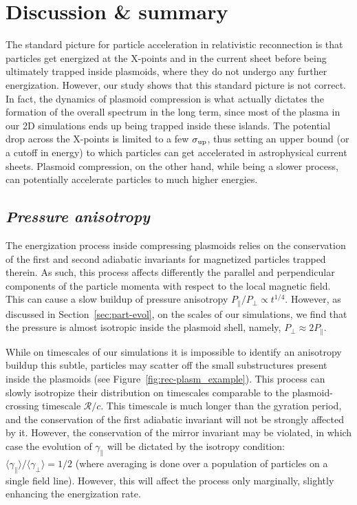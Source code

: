 %
% 
%
% 

\section{Discussion \& summary}
\label{sec:reconnection-discussion}

The standard picture for particle acceleration in relativistic reconnection is that particles get energized at the X-points and in the current sheet before being ultimately trapped inside  plasmoids, where they do not undergo any further energization. However, our study shows that this standard picture is not correct. In fact,  the dynamics of plasmoid compression is what actually dictates the formation of the overall spectrum in the long term, since most of the plasma in our 2D simulations ends up being trapped inside these islands. The potential drop across the X-points is limited to a few $\sigma_{\rm up}$, thus setting an upper bound (or a cutoff in energy) to which particles can get accelerated in astrophysical current sheets. Plasmoid compression, on the other hand, while being a slower process, can potentially accelerate particles to much higher energies.

\subsection*{\small\it Pressure anisotropy}
\label{sec:reconnection-anisotropy}
The energization process inside compressing plasmoids relies on the conservation of the first and second adiabatic invariants for magnetized particles trapped therein. As such, this process affects differently the parallel and perpendicular components of the particle momenta with respect to the local magnetic field. This can cause a slow buildup of pressure anisotropy $P_{\parallel}/P_{\perp} \propto t^{1/4}$. However, as discussed in Section~\ref{sec:part-evol}, on the scales of our simulations, we find that the pressure is almost isotropic inside the plasmoid shell, namely, $P_{\perp}\approx 2P_{\parallel}$. 

While on timescales of our simulations it is impossible to identify an anisotropy buildup this subtle, particles may scatter off the small substructures present inside the plasmoids (see Figure~\ref{fig:rec-plasm_example}). This process can slowly isotropize their distribution on timescales comparable to the plasmoid-crossing timescale $\mathcal{R}/c$. This timescale is much longer than the gyration period, and the conservation of the first adiabatic invariant will not be strongly affected by it. However, the conservation of the mirror invariant may be violated, in which case the evolution of $\gamma_\parallel$ will be dictated by the isotropy condition: $\langle\gamma_\parallel\rangle / \langle\gamma_\perp\rangle = 1/2$ (where averaging is done over a population of particles on a single field line). However, this will affect the process only marginally, slightly enhancing the energization rate.

